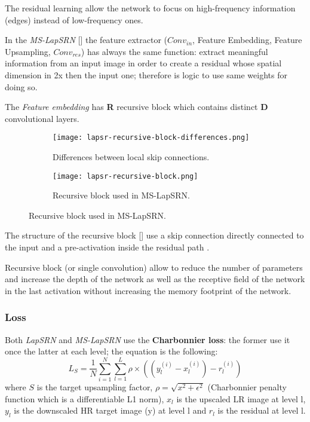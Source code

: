 The residual learning allow the network to focus on high-frequency information (edges) instead of low-frequency ones.

In the \textit{MS-LapSRN} [] the feature extractor ($Conv_{in}$, Feature Embedding, Feature Upsampling, $Conv_{res}$) has always the same function: extract meaningful information from an input image in order to create a residual whose spatial dimension in 2x then the input one; therefore is logic to use same weights for doing so.

The \textit{Feature embedding} has \textbf{R} recursive block \cite{DRCN} \cite{DRRN} which contains distinct \textbf{D} convolutional layers.

\begin{figure}
    \begin{subfigure}{0.49\textwidth}
        \centering
        \texttt{[image: lapsr-recursive-block-differences.png]}
        \caption{Differences between local skip connections.}            
    \end{subfigure}
    \begin{subfigure}{0.49\textwidth}
        \centering
        \texttt{[image: lapsr-recursive-block.png]}
        \caption{Recursive block used in MS-LapSRN.} \label{lapsrn:recursiveblock}
    \end{subfigure}
\end{figure}

The structure of the recursive block [] use a skip connection directly connected to the input and a pre-activation inside the residual path \cite{resnetidentity}.

Recursive block (or single convolution) allow to reduce the number of parameters and increase the depth of the network as well as the receptive field of the network in the last activation without increasing the memory footprint of the network. 

\subsubsection{Loss}
Both \textit{LapSRN} and \textit{MS-LapSRN} use the \textbf{Charbonnier loss}: the former use it once the latter at each level; the equation is the following:
$$
L_S = \frac{1}{N} \sum_{i=1}^{N}\sum_{l=1}^{L} \rho \times \left( \left( y_l^{(i)}-x_l^{(i)} \right) - r_l^{(i)} \right)
$$ where $S$ is the target upsampling factor, $\rho = \sqrt{x^2+\epsilon^2}$ (Charbonnier penalty function which is a differentiable L1 norm), $x_l$ is the upscaled LR image at level l, $y_l$ is the downscaled HR target image (y) at level l and $r_l$ is the residual at level l.

